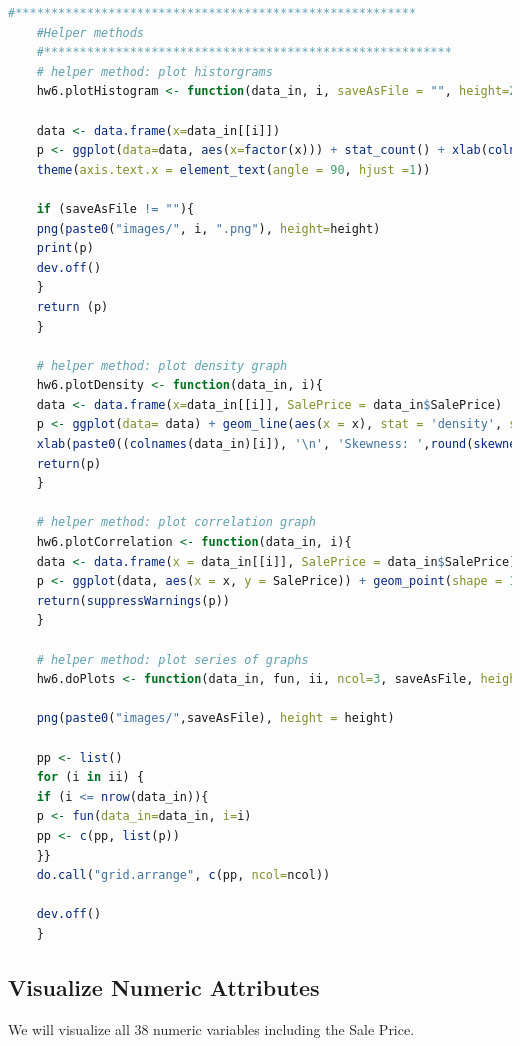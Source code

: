 \documentclass[sigconf]{acmart}
\begin{document}
	\begin{lstlisting}[language=R]
	#********************************************************
	#Helper methods
	#*********************************************************
	# helper method: plot historgrams
	hw6.plotHistogram <- function(data_in, i, saveAsFile = "", height=200) {
	
	data <- data.frame(x=data_in[[i]])
	p <- ggplot(data=data, aes(x=factor(x))) + stat_count() + xlab(colnames(data_in)[i]) + theme_light() + 
	theme(axis.text.x = element_text(angle = 90, hjust =1))
	
	if (saveAsFile != ""){
	png(paste0("images/", i, ".png"), height=height)
	print(p)
	dev.off()
	}
	return (p)
	}
	
	# helper method: plot density graph
	hw6.plotDensity <- function(data_in, i){
	data <- data.frame(x=data_in[[i]], SalePrice = data_in$SalePrice)
	p <- ggplot(data= data) + geom_line(aes(x = x), stat = 'density', size = 1,alpha = 1.0) +
	xlab(paste0((colnames(data_in)[i]), '\n', 'Skewness: ',round(skewness(data_in[[i]], na.rm = TRUE), 2))) + theme_light() 
	return(p)
	}
	
	# helper method: plot correlation graph
	hw6.plotCorrelation <- function(data_in, i){
	data <- data.frame(x = data_in[[i]], SalePrice = data_in$SalePrice)
	p <- ggplot(data, aes(x = x, y = SalePrice)) + geom_point(shape = 1, na.rm = TRUE) + geom_smooth(method = lm ) + xlab(paste0(colnames(data_in)[i], '\n', 'R-Squared: ', round(cor(data_in[[i]], data$SalePrice, use = 'complete.obs'), 2))) + theme_light()
	return(suppressWarnings(p))
	}
	
	# helper method: plot series of graphs
	hw6.doPlots <- function(data_in, fun, ii, ncol=3, saveAsFile, height=300) {
	
	png(paste0("images/",saveAsFile), height = height)
	
	pp <- list()
	for (i in ii) {
	if (i <= nrow(data_in)){
	p <- fun(data_in=data_in, i=i)
	pp <- c(pp, list(p))
	}}
	do.call("grid.arrange", c(pp, ncol=ncol))
	
	dev.off()
	}
	\end{lstlisting}
	
	\subsection{Visualize Numeric Attributes}
		
	We will visualize all 38 numeric variables including the Sale Price.
	
\end{document}
